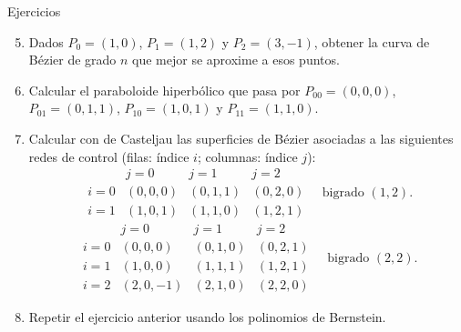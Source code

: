 \documentclass[main.tex]{subfiles}
\begin{document}
\begin{frame}[t]{Ejercicios}
\scriptsize\begin{enumerate}\setcounter{enumi}{4}\item Dados $P_0=(1,0)$, $P_1=(1,2)$ y $P_2=(3,-1)$, obtener la curva de Bézier de grado $n$ que mejor se aproxime a esos puntos.\item Calcular el paraboloide hiperbólico que pasa por $P_{00}=(0,0,0)$, $P_{01}=(0,1,1)$, $P_{10}=(1,0,1)$ y $P_{11}=(1,1,0)$.\item Calcular con de Casteljau las superficies de Bézier asociadas a las siguientes redes de control (filas: índice $i$; columnas: índice $j$):\[\begin{array}{c|ccc} &j=0&j=1&j=2\\\hline i=0&(0,0,0)&(0,1,1)&(0,2,0)\\i=1&(1,0,1)&(1,1,0)&(1,2,1)\end{array}\quad\text{bigrado }(1,2).\]\[\begin{array}{c|ccc} &j=0&j=1&j=2\\\hline i=0&(0,0,0)&(0,1,0)&(0,2,1)\\i=1&(1,0,0)&(1,1,1)&(1,2,1)\\i=2&(2,0,-1)&(2,1,0)&(2,2,0)\end{array}\quad\text{bigrado }(2,2).\]\item Repetir el ejercicio anterior usando los polinomios de Bernstein.\end{enumerate}
\end{frame}
\end{document}
